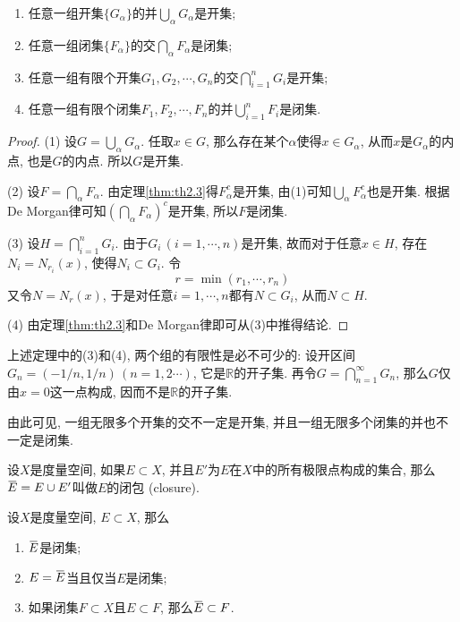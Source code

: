 \documentclass[cn,12pt,math=mtpro2,citestyle=gb7714-2015,bibstyle=gb7714-2015,twocol]{elegantbook}
\newcommand{\R}{\mathbb{R}}
\newcommand{\overbar}[1]{\mkern 1.5mu\overline{\mkern-1.5mu#1\mkern-1.5mu}\mkern 1.5mu}
\begin{document}
\begin{theorem}\label{thm:th2.13}
\begin{enumerate}[label=(\arabic*)]
  \item 任意一组开集$\{G_\alpha\}$的并$\bigcup_\alpha G_\alpha$是开集;

  \item 任意一组闭集$\{F_\alpha\}$的交$\bigcap_\alpha F_\alpha$是闭集;

  \item 任意一组有限个开集$G_1, G_2,\cdots, G_n$的交$\bigcap_{i=1}^nG_i$是开集;

  \item 任意一组有限个闭集$F_1, F_2,\cdots, F_n$的并$\bigcup_{i=1}^nF_i$是闭集.
\end{enumerate}
\end{theorem}
\begin{proof}
  (1) 设$G=\bigcup_\alpha G_\alpha$. 任取$x\in G$, 那么存在某个$\alpha$使得$x\in G_\alpha$, 从而$x$是$G_\alpha$的内点, 也是$G$的内点. 所以$G$是开集.

  (2) 设$F= \bigcap_\alpha F_\alpha$. 由定理\ref{thm:th2.3}得$F_\alpha^c$是开集, 由(1)可知$\bigcup_\alpha F_\alpha^c$也是开集. 根据De Morgan律可知$\left(\bigcap_\alpha F_\alpha\right)^c$是开集, 所以$F$是闭集.

  (3) 设$H=\bigcap_{i=1}^nG_i$. 由于$G_i\, (i=1,\cdots,n)$是开集, 故而对于任意$x\in H$, 存在$N_i=N_{r_i}(x)$, 使得$N_i\subset G_i$. 令
  $$r=\min(r_1,\cdots,r_n)$$
  又令$N=N_r(x)$, 于是对任意$i=1,\cdots,n$都有$N\subset G_i$, 从而$N\subset H$.

  (4) 由定理\ref{thm:th2.3}和De Morgan律即可从(3)中推得结论.


\end{proof}
\begin{remark}
 上述定理中的(3)和(4), 两个组的有限性是必不可少的: 设开区间$G_n=(-1/n,1/n)\,(n=1,2\cdots)$, 它是$\R$的开子集. 再令$G=\bigcap_{n=1}^\infty G_n$, 那么$G$仅由$x=0$这一点构成, 因而不是$\R$的开子集.

 由此可见, 一组无限多个开集的交不一定是开集, 并且一组无限多个闭集的并也不一定是闭集.
\end{remark}
\begin{definition}
设$X$是度量空间, 如果$E\subset X$, 并且$E'$为$E$在$X$中的所有极限点构成的集合, 那么$\overbar{E}=E\cup E'$叫做$E$的闭包 (closure).
\end{definition}
\begin{theorem}\label{thm:th2.5}
  设$X$是度量空间, $E\subset X$, 那么
  \begin{enumerate}[label=(\arabic*)]
  \item $\overbar{E}$是闭集;

  \item $E=\overbar{E}$当且仅当$E$是闭集;

  \item 如果闭集$F\subset X$且$E\subset F$, 那么$\overbar{E}\subset F$.
  \end{enumerate}
\end{theorem}
\end{document}
